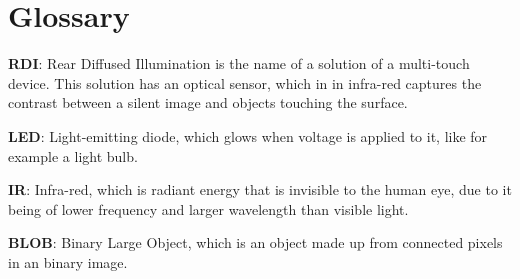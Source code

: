 \chapter*{Glossary}\label{gloss}

\textbf{RDI}: Rear Diffused Illumination is the name of a solution of a multi-touch device\citep{multiTT}. This solution has an optical sensor, which in in infra-red captures the contrast between a silent image and objects touching the surface. 

\textbf{LED}: Light-emitting diode, which glows when voltage is applied to it, like for example a light bulb.

\textbf{IR}: Infra-red, which is radiant energy that is invisible to the human eye, due to it being of lower frequency and larger wavelength than visible light.

\textbf{BLOB}: Binary Large Object, which is an object made up from connected pixels in an binary image. 
